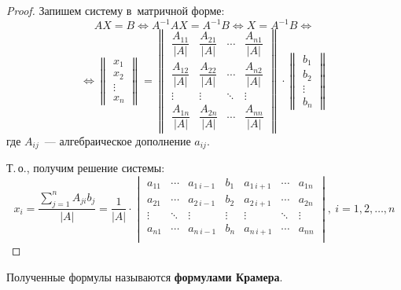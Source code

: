 \begin{proof}
Запишем систему в~матричной форме:
\begin{equation*}
AX = B \Leftrightarrow
A^{-1}AX = A^{-1}B \Leftrightarrow
X = A^{-1}B \Leftrightarrow
\end{equation*}
\begin{equation*}
\Leftrightarrow
\begin{Vmatrix}
x_1 \\
x_2 \\
\vdots \\
x_n
\end{Vmatrix} =
\begin{Vmatrix}
\dfrac{A_{11}}{|A|} & \dfrac{A_{21}}{|A|} & \cdots & \dfrac{A_{n1}}{|A|} \\
\dfrac{A_{12}}{|A|} & \dfrac{A_{22}}{|A|} & \cdots & \dfrac{A_{n2}}{|A|} \\
\vdots & \vdots & \ddots & \vdots \\
\dfrac{A_{1n}}{|A|} & \dfrac{A_{2n}}{|A|} & \cdots & \dfrac{A_{nn}}{|A|}
\end{Vmatrix} \cdot
\begin{Vmatrix}
b_1 \\
b_2 \\
\vdots \\
b_n
\end{Vmatrix}
\end{equation*}
где $A_{ij}$~--- алгебраическое дополнение $a_{ij}$.

Т.\,о., получим решение системы:
\begin{equation*}
x_i = \frac{\displaystyle \sum_{j=1}^n A_{ji} b_j}{|A|} =
\frac1{{|A|}} \cdot
\begin{vmatrix}
a_{11} & \cdots & a_{1\, i-1} & b_{1} & a_{1\, i+1} & \cdots & a_{1n} \\
a_{21} & \cdots & a_{2\, i-1} & b_{2} & a_{2\, i+1} & \cdots & a_{2n} \\
\vdots & \ddots & \vdots & \vdots & \vdots & \ddots & \vdots \\
a_{n1} & \cdots & a_{n\, i-1} & b_{n} & a_{n\, i+1} & \cdots & a_{nn} \\
\end{vmatrix}, \ i = 1, 2, \ldots, n
\end{equation*}
\end{proof}

Полученные формулы называются \textbf{формулами Крамера}.

